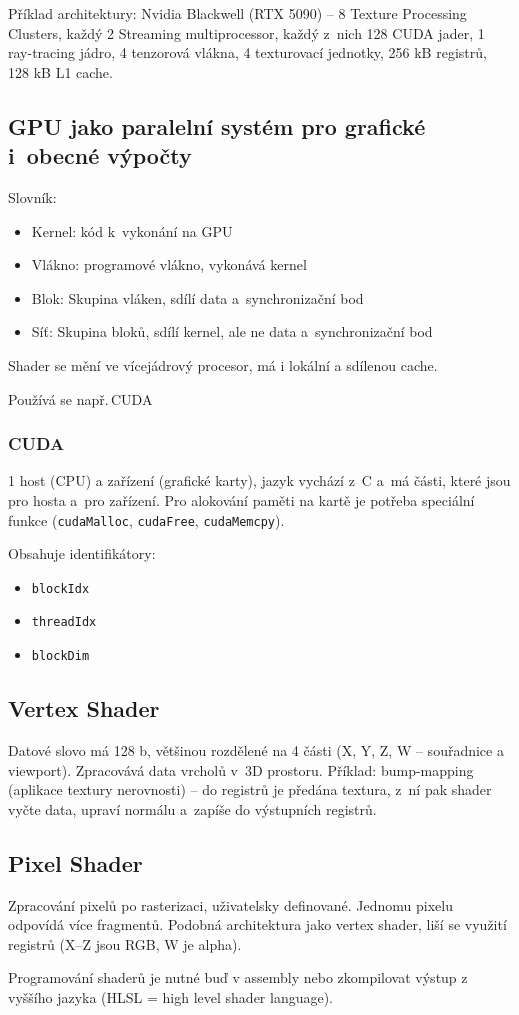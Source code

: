 Příklad architektury: Nvidia Blackwell (RTX 5090) -- 8 Texture Processing Clusters, každý 2 Streaming multiprocessor, každý z~nich 128 CUDA jader, 1 ray-tracing jádro, 4 tenzorová vlákna, 4 texturovací jednotky, 256 kB registrů, 128 kB L1 cache.

\subsection{GPU jako paralelní systém pro grafické i~obecné výpočty}
Slovník:
\begin{itemize}
    \item Kernel: kód k~vykonání na GPU
    \item Vlákno: programové vlákno, vykonává kernel
    \item Blok: Skupina vláken, sdílí data a~synchronizační bod
    \item Síť: Skupina bloků, sdílí kernel, ale ne data a~synchronizační bod
\end{itemize}

Shader se mění ve vícejádrový procesor, má i lokální a sdílenou cache.

Používá se např.\,CUDA

\subsubsection{CUDA}
1 host (CPU) a zařízení (grafické karty), jazyk vychází z~C a~má části, které jsou pro hosta a~pro zařízení. Pro alokování paměti na kartě je potřeba speciální funkce (\texttt{cudaMalloc}, \texttt{cudaFree}, \texttt{cudaMemcpy}).

Obsahuje identifikátory:
\begin{itemize}
    \item \texttt{blockIdx}
    \item \texttt{threadIdx}
    \item \texttt{blockDim}
\end{itemize}

\subsection{Vertex Shader}
Datové slovo má 128 b, většinou rozdělené na 4 části (X, Y, Z, W -- souřadnice a viewport). Zpracovává data vrcholů v~3D prostoru. Příklad: bump-mapping (aplikace textury nerovnosti) -- do registrů je předána textura, z~ní pak shader vyčte data, upraví normálu a~zapíše do výstupních registrů.

\subsection{Pixel Shader}

Zpracování pixelů po rasterizaci, uživatelsky definované. Jednomu pixelu odpovídá více fragmentů. Podobná architektura jako vertex shader, liší se využití registrů (X--Z jsou RGB, W je alpha).

Programování shaderů je nutné buď v assembly nebo zkompilovat výstup z vyššího jazyka (HLSL = high level shader language).